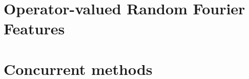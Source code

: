 \chapter{Operator-valued Random Fourier Features}
\label{ch:operator-valued_random_fourier_features}

\chapter{Concurrent methods} %
\label{ch:concurrent_methods}

